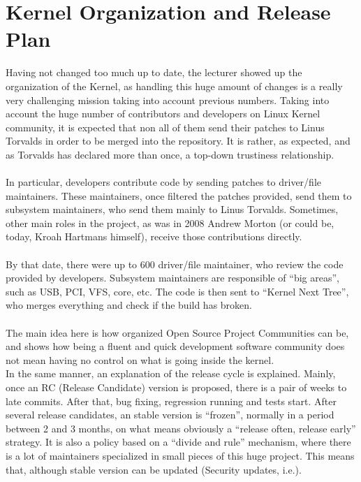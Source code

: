 \documentclass[11pt]{article}
\begin{document}
\section{Kernel Organization and Release Plan}
Having not changed too much up to date, the lecturer showed up the organization of the Kernel, as handling this huge amount of changes is a really very challenging mission taking into account previous numbers. Taking into account the huge number of contributors and developers on Linux Kernel community, it is expected that non all of them send their patches to Linus Torvalds in order to be merged into the repository. It is rather, as expected, and as Torvalds has declared more than once, a top-down trustiness relationship.\\
\\
In particular, developers contribute code by sending patches to driver/file maintainers. These maintainers, once filtered the patches provided, send them to subsystem maintainers, who send them mainly to Linus Torvalds. Sometimes, other main roles in the project, as was in 2008 Andrew Morton (or could be, today, Kroah Hartmans himself), receive those contributions directly.\\
\\
By that date, there were up to 600 driver/file maintainer, who review the code provided by developers. Subsystem maintainers are responsible of ``big areas'', such as USB, PCI, VFS, core, etc. The code is then sent to ``Kernel Next Tree'', who merges everything and check if the build has broken.\\
\\
The main idea here is how organized Open Source Project Communities can be, and shows how being a fluent and quick development software community does not mean having no control on what is going inside the kernel.\\
In the same manner, an explanation of the release cycle is explained. Mainly, once an RC (Release Candidate) version is proposed, there is a pair of weeks to late commits. After that, bug fixing, regression running and tests start. After several release candidates, an stable version is ``frozen'', normally in a period between 2 and 3 months, on what means obviously a ``release often, release early'' strategy. It is also a policy based on a ``divide and rule'' mechanism, where there is a lot of maintainers specialized in small pieces of this huge project. This means that, although stable version can be updated (Security updates, i.e.).\\
\end{document}
